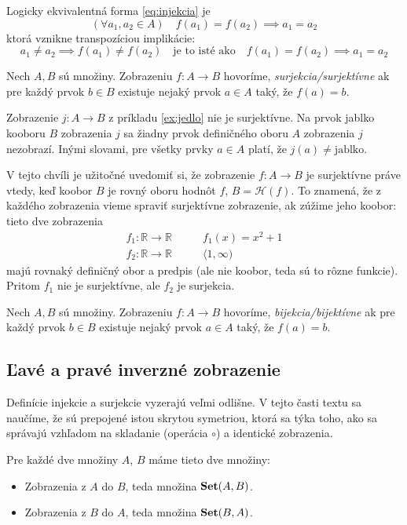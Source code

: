 Logicky ekvivalentná forma \eqref{eq:injekcia} je
\begin{equation}\label{eq:injekcia2}
(\forall a_1,a_2\in A)\quad f(a_1)=f(a_2)\implies a_1=a_2
\end{equation}
ktorá vznikne transpozíciou implikácie:
\[
a_1\neq a_2\implies f(a_1)\neq f(a_2)
\quad
\text{je to isté ako}
\quad
f(a_1)=f(a_2)\implies a_1=a_2
\]
\begin{definition}[surjekcia]\label{def:surjekcia}
Nech $A,B$ sú množiny. Zobrazeniu $f\colon A\to B$ hovoríme,
\emph{surjekcia/surjektívne} ak pre každý prvok $b\in B$ existuje nejaký prvok $a\in A$ taký, že
$f(a)=b$.
\end{definition}
\begin{example}
Zobrazenie $j\colon A\to B$ z príkladu \ref{ex:jedlo} nie je surjektívne. Na prvok jablko kooboru $B$
zobrazenia $j$ sa žiadny prvok definičného oboru $A$ zobrazenia $j$ nezobrazí. Inými slovami, pre všetky prvky $a\in A$
platí, že $j(a)\neq\text{jablko}$.
\end{example}
V tejto chvíli je užitočné uvedomiť si, že zobrazenie $f\colon A\to B$ je surjektívne práve vtedy, keď 
koobor $B$ je rovný oboru hodnôt $f$, $B=\mathcal H(f)$. To znamená, že z každého zobrazenia vieme spraviť surjektívne
zobrazenie, ak zúžime jeho koobor: tieto dve zobrazenia
\begin{align*}
f_1\colon\mathbb R\to \mathbb R&\qquad f_1(x)=x^2+1\\
f_2\colon\mathbb R\to \mathbb R&\qquad \langle 1,\infty)
\end{align*}
majú rovnaký definičný obor a predpis (ale nie koobor, teda sú to rôzne funkcie). Pritom $f_1$ nie je surjektívne, ale
$f_2$ je surjekcia. 
\begin{definition}[bijekcia]\label{def:bijekcia}
Nech $A,B$ sú množiny. Zobrazeniu $f\colon A\to B$ hovoríme,
\emph{bijekcia/bijektívne} ak pre každý prvok $b\in B$ existuje nejaký prvok $a\in A$ taký, že
$f(a)=b$.
\end{definition}
\subsection{Ľavé a pravé inverzné zobrazenie}

Definície injekcie a surjekcie vyzerajú veľmi odlišne. V tejto časti textu sa
naučíme, že sú prepojené istou skrytou symetriou, ktorá sa týka toho, ako sa správajú
vzhľadom na skladanie (operácia $\circ$) a identické zobrazenia.

Pre každé dve množiny $A$, $B$ máme tieto dve množiny:
\begin{itemize}
\item Zobrazenia z $A$ do $B$, teda množina $\mathbf{Set}(A,B)$.
\item Zobrazenia z $B$ do $A$, teda množina $\mathbf{Set}(B,A)$.
\end{itemize}

